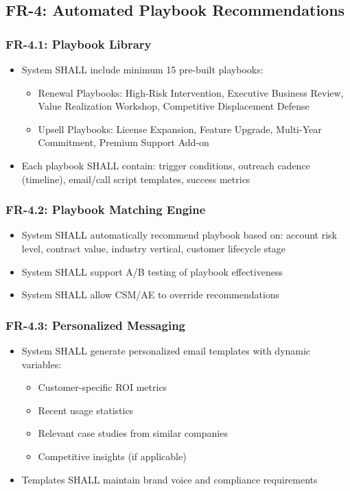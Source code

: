 \documentclass[12pt,a4paper]{article}
\begin{document}
\subsection{FR-4: Automated Playbook Recommendations}
\subsubsection{FR-4.1: Playbook Library}
\begin{itemize}
    \item System SHALL include minimum 15 pre-built playbooks:
    \begin{itemize}
        \item Renewal Playbooks: High-Risk Intervention, Executive Business Review, Value Realization Workshop, Competitive Displacement Defense
        \item Upsell Playbooks: License Expansion, Feature Upgrade, Multi-Year Commitment, Premium Support Add-on
    \end{itemize}
    \item Each playbook SHALL contain: trigger conditions, outreach cadence (timeline), email/call script templates, success metrics
\end{itemize}
\subsubsection{FR-4.2: Playbook Matching Engine}
\begin{itemize}
    \item System SHALL automatically recommend playbook based on: account risk level, contract value, industry vertical, customer lifecycle stage
    \item System SHALL support A/B testing of playbook effectiveness
    \item System SHALL allow CSM/AE to override recommendations
\end{itemize}
\subsubsection{FR-4.3: Personalized Messaging}
\begin{itemize}
    \item System SHALL generate personalized email templates with dynamic variables:
    \begin{itemize}
        \item Customer-specific ROI metrics
        \item Recent usage statistics
        \item Relevant case studies from similar companies
        \item Competitive insights (if applicable)
    \end{itemize}
    \item Templates SHALL maintain brand voice and compliance requirements
\end{itemize}
\end{document}
